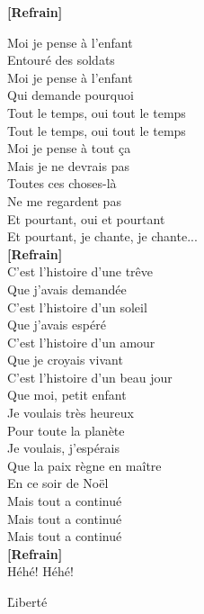 \documentclass{novel}
\begin{document}
\begin{multicols}{2}
\normalsize


\textbf{[Refrain]} \small \\

\normalsize


Moi je pense à l'enfant \\
Entouré des soldats \\
Moi je pense à l'enfant \\
Qui demande pourquoi \\
Tout le temps, oui tout le temps \\
Tout le temps, oui tout le temps \\
Moi je pense à tout ça \\
Mais je ne devrais pas \\
Toutes ces choses-là \\
Ne me regardent pas \\
Et pourtant, oui et pourtant \\
Et pourtant, je chante, je chante... \\

\textbf{[Refrain]} \\

C'est l'histoire d'une trêve \\
Que j'avais demandée \\
C'est l'histoire d'un soleil \\
Que j'avais espéré \\
C'est l'histoire d'un amour \\
Que je croyais vivant \\
C'est l'histoire d'un beau jour \\
Que moi, petit enfant \\
Je voulais très heureux \\
Pour toute la planète \\
Je voulais, j'espérais \\
Que la paix règne en maître \\
En ce soir de Noël \\
Mais tout a continué \\
Mais tout a continué \\
Mais tout a continué \\

\textbf{[Refrain]} \\

Héhé! Héhé!
\end{multicols}

\newpage
\Large

\h*{Liberté}
\end{document}
